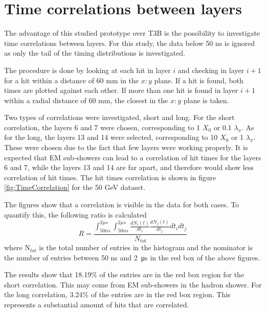 \section{Time correlations between layers}

The advantage of this studied prototype over T3B is the possibility to investigate time correlations between layers. For this study, the data below 50 ns is ignored as only the tail of the timing distributions is investigated.

The procedure is done by looking at each hit in layer $i$ and checking in layer $i+1$ for a hit within a distance of 60 mm in the $x:y$ plane. If a hit is found, both times are plotted against each other. If more than one hit is found in layer $i+1$ within a radial distance of 60 mm, the closest in the $x:y$ plane is taken.

Two types of correlations were investigated, short and long. For the short correlation, the layers 6 and 7 were chosen, corresponding to 1 $X_0$ or 0.1 $\lambda_{\pi}$. As for the long, the layers 13 and 14 were selected, corresponding to 10 $X_0$ or 1 $\lambda_{\pi}$. These were chosen due to the fact that few layers were working properly. It is expected that EM sub-showers can lead to a correlation of hit times for the layers 6 and 7, while the layers 13 and 14 are far apart, and therefore would show less correlation of hit times. The hit times correlation is shown in figure \ref{fig:TimeCorrelation} for the 50 GeV dataset.

The figures show that a correlation is visible in the data for both cases. To quantify this, the following ratio is calculated
\begin{equation}\label{eq:CorrelCalcul}
	R = \frac{\int_{50 ns}^{2 \mu s} \int_{50 ns}^{2 \mu s} \frac{dN_i(t)}{dt_i} \frac{dN_j(t)}{dt_j} dt_i dt_j}{N_{tot}}
\end{equation}
where N$_{tot}$ is the total number of entries in the histogram and the nominator is the number of entries between 50 ns and \SI{2}{\micro\second} in the red box of the above figures.

The results show that 18.19\% of the entries are in the red box region for the short correlation. This may come from EM sub-showers in the hadron shower. For the long correlation, 3.24\% of the entries are in the red box region. This represents a substantial amount of hits that are correlated.

